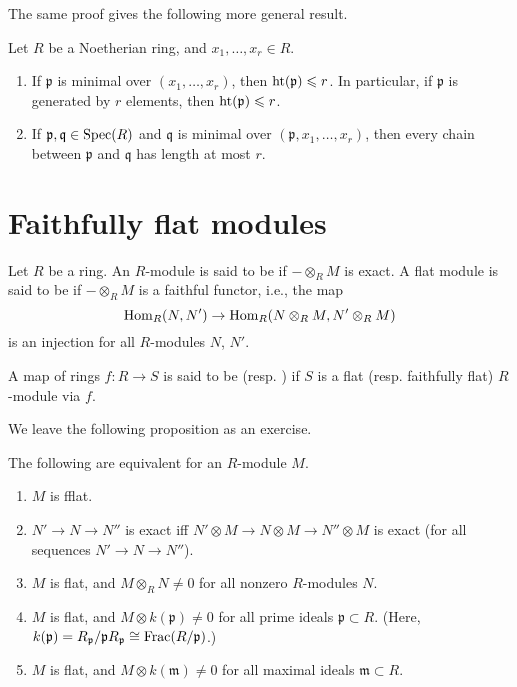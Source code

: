 \documentclass[12pt]{article}
\begin{document}
The same proof gives the following more general result.

\begin{prop}
	Let $R$ be a Noetherian ring, and $x_{1}, \ldots, x_{r} \in R$.
	\begin{enumerate}
		\item If $\mathfrak{p}$ is minimal over $(x_{1}, \ldots, x_{r})$, then $\operatorname{ht}(\mathfrak{p}) \leqslant r$. \newline
		In particular, if $\mathfrak{p}$ is generated by $r$ elements, then $\operatorname{ht}(\mathfrak{p}) \leqslant r$.
		\item If $\mathfrak{p}, \mathfrak{q} \in \operatorname{Spec}(R)$ and $\mathfrak{q}$ is minimal over $(\mathfrak{p}, x_{1}, \ldots, x_{r})$, then every chain between $\mathfrak{p}$ and $\mathfrak{q}$ has length at most $r$.
	\end{enumerate}
\end{prop}

\section{Faithfully flat modules}

\begin{defn}
	Let $R$ be a ring. An $R$-module is said to be  if $- \otimes_{R} M$ is exact. \newline
	A flat module is said to be  if $- \otimes_{R} M$ is a faithful functor, i.e., the map
	\begin{equation*} 
		\operatorname{Hom}_{R}(N, N') \to \operatorname{Hom}_{R}(N \otimes_{R} M, N' \otimes_{R} M)
	\end{equation*}
	is an injection for all $R$-modules $N$, $N'$.

	A map of rings $f : R \to S$ is said to be  (resp. ) if $S$ is a flat (resp. faithfully flat) $R$-module via $f$.
\end{defn}

We leave the following proposition as an exercise.

\begin{prop} \label{prop:equiv-fflat}
	The following are equivalent for an $R$-module $M$.
	\begin{enumerate}
		\item $M$ is fflat.
		\item $N' \to N \to N''$ is exact iff $N' \otimes M \to N \otimes M \to N'' \otimes M$ is exact (for all sequences $N' \to N \to N''$).
		\item $M$ is flat, and $M \otimes_{R} N \neq 0$ for all nonzero $R$-modules $N$.
		\item $M$ is flat, and $M \otimes k(\mathfrak{p}) \neq 0$ for all prime ideals $\mathfrak{p} \subset R$. \newline
		(Here, $k(\mathfrak{p}) = R_{\mathfrak{p}}/\mathfrak{p} R_{\mathfrak{p}} \cong \operatorname{Frac}(R/\mathfrak{p})$.)
		\item \label{item:fflat-5} $M$ is flat, and $M \otimes k(\mathfrak{m}) \neq 0$ for all maximal ideals $\mathfrak{m} \subset R$.
	\end{enumerate}
\end{prop}
\end{document}

